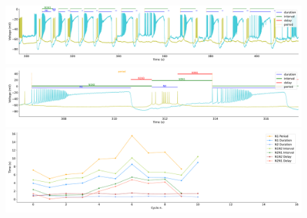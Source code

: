  	


\begin{figure}[htbp]
	\centering
	\begin{minipage}[b]{\textwidth}
		\centering
		\includegraphics[width=\textwidth,height=0.1\textheight]{./invariants/data/SUSSEX/prep4_so_no_driven/images/prep4_so_no_driven_signal_intervals_zoom.pdf}
		\includegraphics[width=\textwidth]{./invariants/data/SUSSEX/prep4_so_no_driven/images/prep4_so_no_driven_signal_intervals_cycle.pdf}
		\includegraphics[width=\textwidth]{./invariants/data/SUSSEX/prep4_so_no_driven/images/prep4_so_no_driven_time_cycle.pdf}
	\end{minipage}
	\centering
	\begin{minipage}[b]{0.45\textwidth}
		\centering

\end{minipage}
\end{figure}
